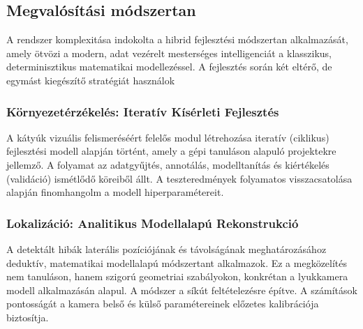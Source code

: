 \subsection{\texorpdfstring{Megvalósítási módszertan
}{Megvalósítási módszertan }}\label{megvaluxf3suxedtuxe1si-muxf3dszertan}

A rendszer komplexitása indokolta a hibrid fejlesztési módszertan
alkalmazását, amely ötvözi a modern, adat vezérelt mesterséges
intelligenciát a klasszikus, determinisztikus matematikai modellezéssel.
A fejlesztés során két eltérő, de egymást kiegészítő stratégiát
használok

\subsubsection{\texorpdfstring{Környezetérzékelés: Iteratív Kísérleti
Fejlesztés
}{Környezetérzékelés: Iteratív Kísérleti Fejlesztés }}\label{kuxf6rnyezetuxe9rzuxe9keluxe9s-iteratuxedv-kuxedsuxe9rleti-fejlesztuxe9s}

A kátyúk vizuális felismeréséért felelős modul létrehozása iteratív
(ciklikus) fejlesztési modell alapján történt, amely a gépi tanuláson
alapuló projektekre jellemző. A folyamat az adatgyűjtés, annotálás,
modelltanítás és kiértékelés (validáció) ismétlődő köreiből állt. A
teszteredmények folyamatos visszacsatolása alapján finomhangolm a modell
hiperparamétereit.

\subsubsection{Lokalizáció: Analitikus Modellalapú
Rekonstrukció}\label{lokalizuxe1ciuxf3-analitikus-modellalapuxfa-rekonstrukciuxf3}

A detektált hibák laterális pozíciójának és távolságának
meghatározásához deduktív, matematikai modellalapú módszertant
alkalmazok. Ez a megközelítés nem tanuláson, hanem szigorú geometriai
szabályokon, konkrétan a lyukkamera modell alkalmazásán alapul. A
módszer a síkút feltételezésre építve. A számítások pontosságát a kamera
belső és külső paramétereinek előzetes kalibrációja biztosítja.